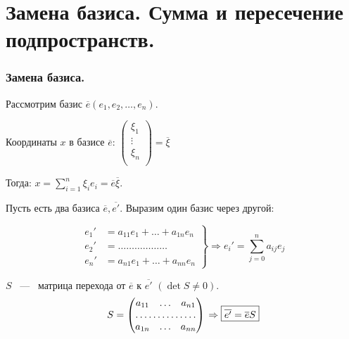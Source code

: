 \part{Замена базиса. Сумма и пересечение подпространств.}
\section{Замена базиса.}
Рассмотрим базис $\overline{e}(e_1,e_2,\dots,e_n)$.

Координаты $x$ в базисе $\overline{e}$: $ \begin{pmatrix}
\xi_1\\  
\vdots\\
\xi_n\\
\end{pmatrix} = \overline{\xi}$

\vspace{0.25cm}
Тогда: $x  = \sum\limits_{i=1}^n \xi_ie_i = \overline{e}\overline{\xi}$.
\vspace{5mm}

Пусть есть два базиса $\overline{e}, \overline{e'}$. Выразим один базис через другой:

\begin{equation*}
\left.
\begin{aligned}
e_1' &= a_{11}e_1 + \dots+ a_{1n}e_n\\
e_2' &= \dots\dots\dots\dots\dots\dots\\
e_n' &= a_{n1}e_1 + \dots  + a_{nn}e_n
\end{aligned} 
\right\} \Rightarrow e_i' = \sum\limits_{j=0}^n a_{ij}e_j \end{equation*}


\vspace{3mm}

$S$ ~---~ \textsf{матрица перехода} от $\overline{e}$ к $\overline{e'}$ $(\det S\neq 0).$
\begin{equation*}
\left.
\begin{aligned}S = \begin{pmatrix}
a_{11} & \dots & a_{n1}\\
\hdotsfor{3}\\
a_{1n} & \dots & a_{nn}\\
\end{pmatrix}
\end{aligned} 
\right. \Rightarrow \boxed{\overline{e'} = \overline{e}S}
\end{equation*}
\vspace{3mm}

